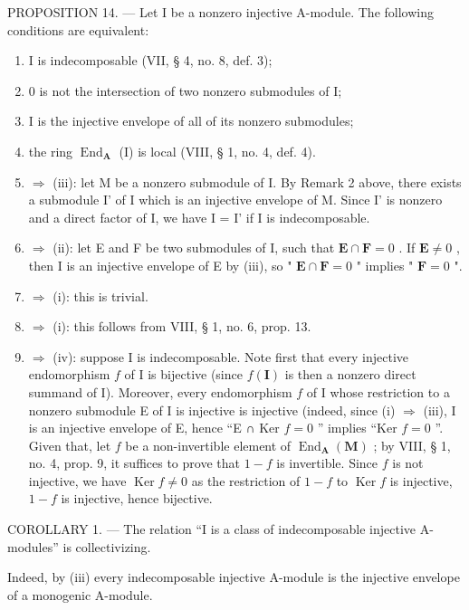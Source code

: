 PROPOSITION 14. --- Let I be a nonzero injective A-module. The following conditions are equivalent:

\begin{enumerate}
\def\labelenumi{(\roman{enumi})}
\item
  I is indecomposable (VII, § 4, no. 8, def. 3);
\item
  0 is not the intersection of two nonzero submodules of I;
\item
  I is the injective envelope of all of its nonzero submodules;
\item
  the ring \(\operatorname{End}_{\mathbf{A}}\) (I) is local (VIII, § 1, no. 4, def. 4).
\item
  \(\Rightarrow\) (iii): let M be a nonzero submodule of I. By Remark 2 above, there exists a submodule I' of I which is an injective envelope of M. Since I' is nonzero and a direct factor of I, we have I = I' if I is indecomposable.
\item
  \(\Rightarrow\) (ii): let E and F be two submodules of I, such that \(\mathbf{E} \cap \mathbf{F} = 0\) . If \(\mathbf{E} \neq 0\) , then I is an injective envelope of E by (iii), so " \(\mathbf{E} \cap \mathbf{F} = 0\) " implies " \(\mathbf{F} = 0\) ".
\item
  \(\Rightarrow\) (i): this is trivial.
\item
  \(\Rightarrow\) (i): this follows from VIII, § 1, no. 6, prop. 13.
\item
  \(\Rightarrow\) (iv): suppose I is indecomposable. Note first that every injective endomorphism \(f\) of I is bijective (since \(f(\mathbf{I})\) is then a nonzero direct summand of I). Moreover, every endomorphism \(f\) of I whose restriction to a nonzero submodule E of I is injective is injective (indeed, since (i) \(\Rightarrow\) (iii), I is an injective envelope of E, hence “E ∩ Ker \(f = 0\) ” implies “Ker \(f = 0\) ”. Given that, let \(f\) be a non-invertible element of \(\operatorname{End}_{\mathbf{A}}(\mathbf{M})\) ; by VIII, § 1, no. 4, prop. 9, it suffices to prove that \(1 - f\) is invertible. Since \(f\) is not injective, we have \(\operatorname{Ker} f \neq 0\) as the restriction of \(1 - f\) to \(\operatorname{Ker} f\) is injective, \(1 - f\) is injective, hence bijective.
\end{enumerate}

COROLLARY 1. --- The relation “I is a class of indecomposable injective A-modules” is collectivizing.

Indeed, by (iii) every indecomposable injective A-module is the injective envelope of a monogenic A-module.

